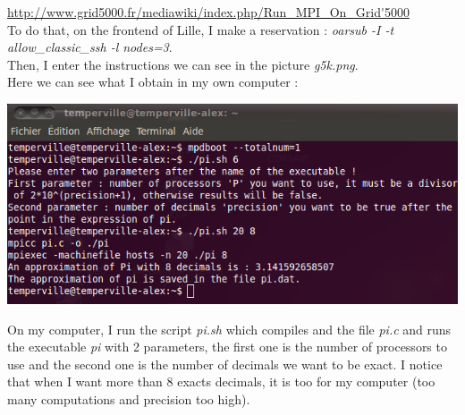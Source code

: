 \documentclass[10pt]{article}
\begin{document}
\; \hspace{2cm} \url{http://www.grid5000.fr/mediawiki/index.php/Run_MPI_On_Grid'5000} \\

To do that, on the frontend of Lille, I make a reservation : \textit{oarsub -I -t allow\_classic\_ssh -l nodes=3}. \\
Then, I enter the instructions we can see in the picture \textit{g5k.png}. \\

Here we can see what I obtain in my own computer : \\
\begin{center}
\includegraphics[scale=0.5]{myPC.png} 
\end{center}

On my computer, I run the script \textit{pi.sh} which compiles and the file \textit{pi.c} and runs the executable \textit{pi} with 2 parameters, the first one is the number of processors to use and the second one is the number of decimals we want to be exact. I notice that when I want more than 8 exacts decimals, it is too for my computer (too many computations and precision too high).
\end{document}
